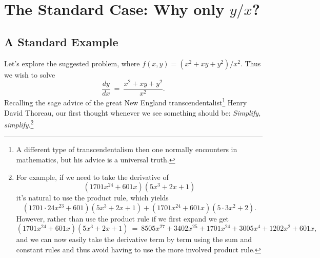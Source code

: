 \documentclass[12pt,reqno]{amsart}
\theoremstyle{plain}
\numberwithin{equation}{section} %
\numberwithin{table}{section} %
\numberwithin{figure}{section}
\begin{document}
\section{The Standard Case: Why only $y/x$?}\label{sec:proofmainyxr}


\subsection{A Standard Example}

Let's explore the suggested problem, where $f(x,y) = (x^2 + xy + y^2)/x^2$. Thus we wish to solve \begin{equation}\label{eq:suggestedprobleminsubsec} \frac{dy}{dx} \ = \ \frac{x^2 + xy + y^2}{x^2}. \end{equation} Recalling the sage advice of the great New England transcendentalist\footnote{A different type of transcendentalism then one normally encounters in mathematics, but his advice is a universal truth.} Henry David Thoreau, our first thought whenever we see something should be: \emph{Simplify, simplify}.\footnote{For example, if we need to take the derivative of $$(1701 x^{24} + 601 x) (5 x^3 + 2 x + 1)$$ it's natural to use the product rule, which yields $$(1701 \cdot 24 x^{23} + 601) (5x^3 + 2x + 1) + (1701 x^{24} + 601 x) (5 \cdot 3 x^2 + 2). $$ However, rather than use the product rule if we first expand we get $$(1701 x^{24} + 601 x) (5 x^3 + 2 x + 1) \ = \ 8505 x^{27}+3402 x^{25}+1701 x^{24}+3005 x^4+1202 x^2+601 x, $$ and we can now easily take the derivative term by term using the sum and constant rules and thus avoid having to use the more involved product rule.}
\end{document}
